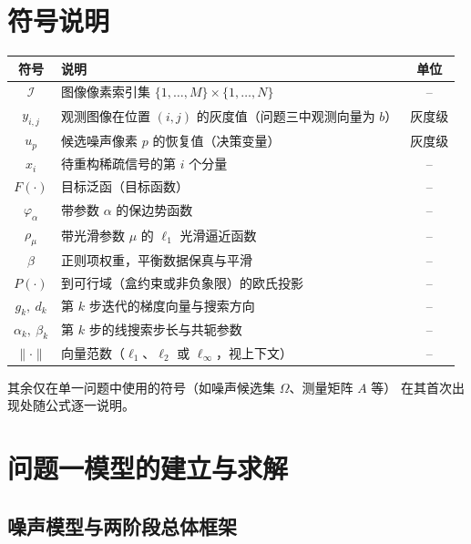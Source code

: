 \documentclass[withoutpreface,bwprint]{cumcmthesis}
\begin{document}
\section{符号说明}

\begin{center}
\begin{tabular}{clc}
  \toprule[1.5pt]
  符号 & 说明 & 单位 \\
  \midrule[1pt]
  $\mathcal I$ & 图像像素索引集 $\{1,\ldots,M\}\times\{1,\ldots,N\}$ & -- \\
  $y_{i,j}$ & 观测图像在位置 $(i,j)$ 的灰度值（问题三中观测向量为 $b$） & 灰度级 \\
  $u_{p}$ & 候选噪声像素 $p$ 的恢复值（决策变量） & 灰度级 \\
  $x_{i}$ & 待重构稀疏信号的第 $i$ 个分量 & -- \\
  $F(\cdot)$ & 目标泛函（目标函数） & -- \\
  $\varphi_{\alpha}$ & 带参数 $\alpha$ 的保边势函数 & -- \\
  $\rho_{\mu}$ & 带光滑参数 $\mu$ 的 $\ell_1$ 光滑逼近函数 & -- \\
  $\beta$ & 正则项权重，平衡数据保真与平滑 & -- \\
  $P(\cdot)$ & 到可行域（盒约束或非负象限）的欧氏投影 & -- \\
  $g_k,\ d_k$ & 第 $k$ 步迭代的梯度向量与搜索方向 & -- \\
  $\alpha_k,\ \beta_k$ & 第 $k$ 步的线搜索步长与共轭参数 & -- \\
  $\|\cdot\|$ & 向量范数（$\ell_1$、$\ell_2$ 或 $\ell_\infty$，视上下文） & -- \\
  \bottomrule[1.5pt]
\end{tabular}
\end{center}

其余仅在单一问题中使用的符号（如噪声候选集 $\Omega$、测量矩阵 $A$ 等）
在其首次出现处随公式逐一说明。

\section{问题一模型的建立与求解}

\subsection{噪声模型与两阶段总体框架}
\end{document}
